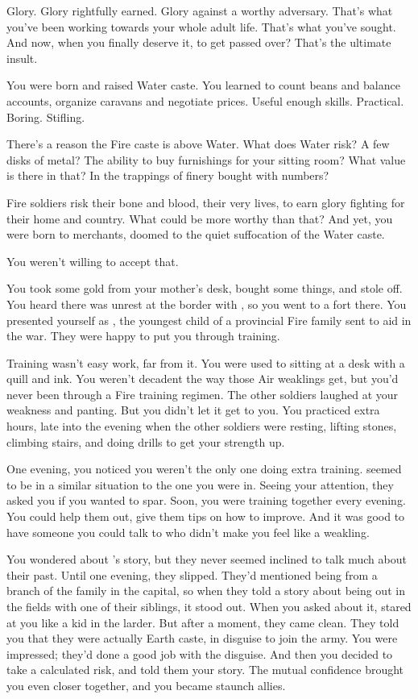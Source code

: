 \documentclass[char]{iron}
\begin{document}
\name{\cLieutenant{}}

Glory.  Glory rightfully earned.  Glory against a worthy adversary.  That's
what you've been working towards your whole adult life.  That's what you've
sought.  And now, when you finally deserve it, to get passed over?  That's
the ultimate insult.

You were born and raised Water caste.  You learned to count beans and balance
accounts, organize caravans and negotiate prices.  Useful enough skills.
Practical.  Boring.  Stifling.

There's a reason the Fire caste is above Water.  What does Water risk?
A few disks of metal?  The ability to buy furnishings for your sitting
room?  What value is there in that?  In the trappings of finery bought
with numbers?

Fire soldiers risk their bone and blood, their very lives, to earn
glory fighting for their home and country.  What could be more worthy
than that?  And yet, you were born to merchants, doomed to the quiet
suffocation of the Water caste.

You weren't willing to accept that.

You took some gold from your mother's desk, bought some things, and stole
off.  You heard there was unrest at the border with \sMulanCountry{},
so you went to a fort there.  You presented yourself as \cLieutenant{},
the youngest child of a provincial Fire family sent to aid in the war.
They were happy to put you through training.

Training wasn't easy work, far from it.  You were used to sitting at a desk
with a quill and ink.  You weren't decadent the way those Air weaklings get,
but you'd never been through a Fire training regimen.  The other soldiers
laughed at your weakness and panting.  But you didn't let it get to you.
You practiced extra hours, late into the evening when the other soldiers were
resting, lifting stones, climbing stairs, and doing drills to get your
strength up.

One evening, you noticed you weren't the only one doing extra training.
\cMulan{\intro} seemed to be in a similar situation to the one you were in.  Seeing
your attention, they asked you if you wanted to spar.  Soon, you were
training together every evening.  You could help them out, give them
tips on how to improve.  And it was good to have someone you could talk to
who didn't make you feel like a weakling.

You wondered about \cMulan{\first}'s story, but they never seemed inclined
to talk much about their past.  Until one evening, they slipped.  They'd
mentioned being from a branch of the \cMulan{\last} family in the capital,
so when they told a story about being out in the fields with one of their
siblings, it stood out.  When you asked about it, \cMulan{\first} stared
at you like a kid in the larder.  But after a moment, they came clean.
They told you that they were actually Earth caste, in disguise to join
the army.  You were impressed; they'd done a good job with the disguise.
And then you decided to take a calculated risk, and told them your
story.  The mutual confidence brought you even closer together, and
you became staunch allies.
\end{document}
